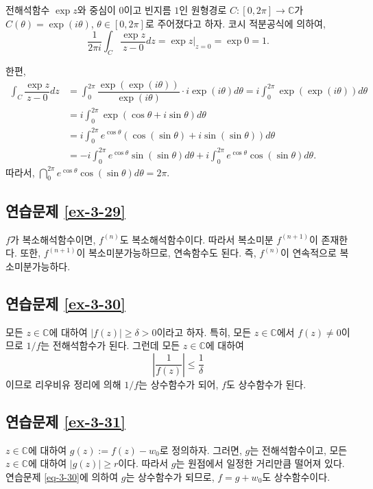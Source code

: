 전해석함수 $\exp z$와 중심이 $0$이고 빈지름 $1$인 원형경로
$C:[0,2\pi] \to \mathbb C$가 $C(\theta) = \exp(i\theta)$, $\theta \in [0,2\pi]$로 
주어졌다고 하자.
코시  적분공식에 의하여,
\[
\dfrac1{2\pi i} \int_C \dfrac{\exp z}{z-0}dz = \exp z\Big|_{z=0} = \exp 0 = 1.
\]

한편,
\begin{align*}
\int_C \dfrac{\exp z}{z-0}dz 
&= \int_0^{2\pi} \dfrac{\exp(\exp(i\theta))}{\exp(i\theta)}\cdot i{\exp(i\theta)}d\theta
= i \int_0^{2\pi}  \exp(\exp(i\theta))d\theta \\
&=i \int_0^{2\pi}   \exp(\cos\theta +i\sin\theta)d\theta\\
&= i \int_0^{2\pi}  e^{\cos\theta} (\cos(\sin\theta) + i\sin(\sin\theta))d\theta\\
&= - i \int_0^{2\pi}   e^{\cos\theta} \sin(\sin\theta)d\theta 
+ i \int_0^{2\pi}     e^{\cos\theta} \cos(\sin\theta)d\theta.
\end{align*}
따라서,
$\dint_0^{2\pi} e^{\cos\theta} \cos(\sin\theta)d\theta = 2\pi$.

\subsection*{연습문제 \ref{ex-3-29}}

$f$가 복소해석함수이면, $f^{(n)}$도 복소해석함수이다.
따라서 복소미분 $f^{(n+1)}$이 존재한다.
또한, $f^{(n+1)}$이 복소미분가능하므로, 연속함수도 된다.
즉, $f^{(n)}$이 연속적으로 복소미분가능하다.

\subsection*{연습문제 \ref{ex-3-30}}

모든 $ z\in \mathbb C$에 대하여
$|f(z)| \ge \delta >0$이라고 하자.
특히, 모든 $z\in\mathbb C$에서 $f(z)\ne0$이므로
$1/f$는 전해석함수가 된다.
그런데 모든 $z\in\mathbb C$에 대하여
\[
\left| \dfrac1{f(z)}\right| \le \dfrac1\delta
\]
이므로 리우비유 정리에 의해 $1/f$는 상수함수가 되어,
$f$도 상수함수가 된다.

\subsection*{연습문제 \ref{ex-3-31}}

$z\in\mathbb C$에 대하여 $g(z):= f(z) - w_0$로  정의하자.
그러면, $g$는 전해석함수이고, 모든 $z\in\mathbb C$에 대하여  $|g(z)|\ge r$이다.
따라서 $g$는 원점에서 일정한 거리만큼 떨어져 있다.
연습문제 \ref{eq-3-30}에 의하여 $g$는 상수함수가 되므로,
$f = g +w_0$도 상수함수이다.

